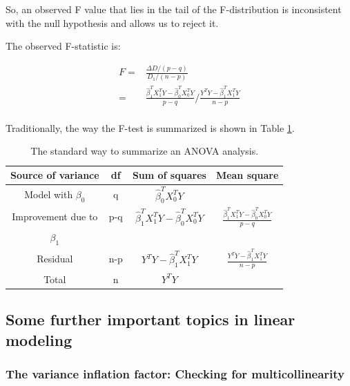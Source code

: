 \documentclass[
  12pt,
]{krantz}
\theoremstyle{definition}
\theoremstyle{definition}
\theoremstyle{definition}
\theoremstyle{definition}
\theoremstyle{remark}
\begin{document}
So, an observed F value that lies in the tail of the F-distribution is inconsistent with the null hypothesis and allows us to reject it.

The observed F-statistic is:

\begin{equation}
\begin{split}
F=&\frac{\Delta D/(p-q)}{D_1/(n-p)} \\
=& \frac{\hat \beta_1^T X_1^T Y - \hat \beta_0^T X_0^T Y}{p-q} /
\frac{Y^T Y - \hat \beta_1^T X_1^TY}{n-p}\\
\end{split}
\end{equation}

Traditionally, the way the F-test is summarized is shown in Table \ref{tab:anovasummary}.

\begin{table}[!htbp]
\caption{The standard way to summarize an ANOVA analysis.}
\begin{center}
\begin{tabular}{|c|c|c|c|}
\hline
Source of variance & df & Sum of squares & Mean square\\
\hline
Model with $\beta_0$ & q & $\hat\beta_0^T X_0^T Y$ & \\
Improvement due to & p-q & $\hat \beta_1^T X_1^T Y - \hat \beta_0^T X_0^T Y$ & $\frac{\hat \beta_1^T X_1^T Y - \hat \beta_0^T X_0^T Y}{p-q}$\\
$\beta_1$ & & & \\
Residual & n-p & $Y^T Y - \hat \beta_1^T X_1^TY$  & $\frac{Y^T Y - \hat \beta_1^T X_1^TY}{n-p}$\\
\hline
Total & n & $Y^T Y$ & \\
\hline
\end{tabular}
\end{center}
\label{tab:anovasummary}
\end{table}

\hypertarget{some-further-important-topics-in-linear-modeling}{%
\subsection{Some further important topics in linear modeling}\label{some-further-important-topics-in-linear-modeling}}

\hypertarget{the-variance-inflation-factor-checking-for-multicollinearity}{%
\subsubsection{The variance inflation factor: Checking for multicollinearity}\label{the-variance-inflation-factor-checking-for-multicollinearity}}
\end{document}
